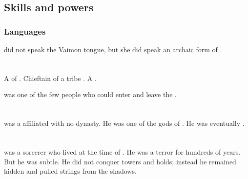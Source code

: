 \subsection{Skills and powers}





\subsubsection{Languages}
\Lethiarch did not speak the Vaimon tongue, but she did speak an archaic form of . 















\section{\Najarod}
\index{\Najarod}
A \resphan{} of \Baelzerach. 
Chieftain of a tribe  \QuessanthIshnaruchaefir. 
A .

\Najarod{} was one of the few people who could enter and leave the . 















\section{\Osra}
\index{\Osra}
\Osra was a \bezed \resphan affiliated with no dynasty. 
He was one of the gods of . 
He was eventually . 















\section{\Sartheron}
\index{\Sartheron}
\Sartheron was a \resphan sorcerer who lived at the time of \Merkyrah. 
He was a terror for hundreds of years.
But he was subtle.
He did not conquer towers and holds; instead he remained hidden and pulled strings from the shadows.

